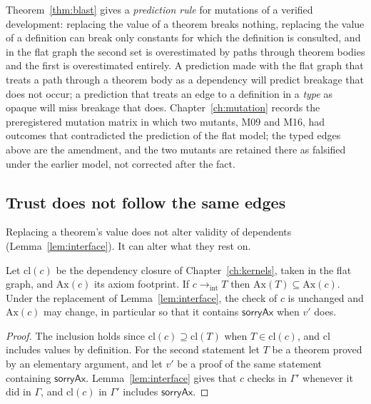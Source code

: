 Theorem~\ref{thm:blast} gives a \emph{prediction rule} for mutations of a verified development: replacing the value of a theorem breaks nothing, replacing the value of a definition can break only constants for which the definition is consulted, and in the flat graph the second set is overestimated by paths through theorem bodies and the first is overestimated entirely. A prediction made with the flat graph that treats a path through a theorem body as a dependency will predict breakage that does not occur; a prediction that treats an edge to a definition in a \emph{type} as opaque will miss breakage that does. Chapter~\ref{ch:mutation} records the preregistered mutation matrix in which two mutants, M09 and M16, had outcomes that contradicted the prediction of the flat model; the typed edges above are the amendment, and the two mutants are retained there as falsified under the earlier model, not corrected after the fact.

\subsection*{Trust does not follow the same edges}

Replacing a theorem's value does not alter validity of dependents (Lemma~\ref{lem:interface}). It can alter what they rest on.

\begin{proposition}
\label{prop:trust-edges}
Let $\mathrm{cl}(c)$ be the dependency closure of Chapter~\ref{ch:kernels}, taken in the flat graph, and $\mathrm{Ax}(c)$ its axiom footprint. If $c\to_{\mathrm{int}}T$ then $\mathrm{Ax}(T)\subseteq\mathrm{Ax}(c)$. Under the replacement of Lemma~\ref{lem:interface}, the check of $c$ is unchanged and $\mathrm{Ax}(c)$ may change, in particular so that it contains $\mathsf{sorryAx}$ when $v'$ does.
\end{proposition}

\begin{proof}
The inclusion holds since $\mathrm{cl}(c)\supseteq\mathrm{cl}(T)$ when $T\in\mathrm{cl}(c)$, and $\mathrm{cl}$ includes values by definition. For the second statement let $T$ be a theorem proved by an elementary argument, and let $v'$ be a proof of the same statement containing $\mathsf{sorryAx}$. Lemma~\ref{lem:interface} gives that $c$ checks in $\Gamma'$ whenever it did in $\Gamma$, and $\mathrm{cl}(c)$ in $\Gamma'$ includes $\mathsf{sorryAx}$.
\end{proof}

